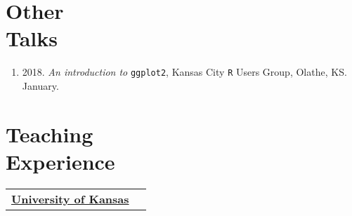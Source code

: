 \documentclass[margin,line,pifont,palatino,courier]{res}
\begin{document}
\begin{resume}
\section{\sc Other\\ Talks}

\begin{enumerate}
\item 2018. \emph{An introduction to} \verb+ggplot2+, Kansas City \verb+R+ Users Group,
Olathe, KS. January.
\end{enumerate}

\section{\sc Teaching\\ Experience}

\begin{tabular}{ll}
  \textbf{\underline{University of Kansas}} & \tabularnewline

\end{tabular}
\end{resume}
\end{document}
